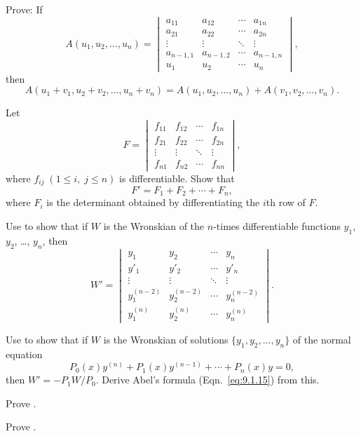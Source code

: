 \begin{exerciselist}
\item\label{exer:9.1.17}Prove:  If
\[
A(u_1,u_2,\dots,u_n)=
\begin{vmatrix}
a_{11}&a_{12}&\cdots&a_{1n}\\
a_{21}&a_{22}&\cdots&a_{2n}\\
\vdots&\vdots&\ddots&\vdots\\
a_{n-1,1}&a_{n-1,2}&\cdots&a_{n-1,n}\\
u_1&u_2&\cdots&u_n
\end{vmatrix},
\]
then
\[
A(u_1+v_1, u_2+v_2,\dots,
  u_n+v_n)=A(u_1,u_2,\dots,u_n)+A(v_1,v_2,\dots,
  v_n).
\]

\item\label{exer:9.1.18}Let
\[
F=\begin{vmatrix}
f_{11}&f_{12}&\cdots&f_{1n}\\
f_{21}&f_{22}&\cdots&f_{2n}\\
\vdots&\vdots&\ddots&\vdots\\
f_{n1}&f_{n2}&\cdots&f_{nn}
\end{vmatrix},
\]
where $f_{ij}\; (1\le i,\;   j\le n)$ is differentiable.  Show that
\[
F'=F_1+F_2+\cdots+F_n,
\]
where $F_i$ is the determinant obtained by differentiating the
$i$th row of $F$.


\item\label{exer:9.1.19}Use   to show that if $W$ is the
Wronskian of the
$n$-times differentiable functions $y_1$, $y_2$, \dots, $y_n$, then
\[
W'=
\begin{vmatrix}
y_1&y_2&\cdots&y_n\\
y'_1&y'_2&\cdots&y'_n\\
\vdots&\vdots&\ddots&\vdots\\
y_1^{(n-2)}&y_2^{(n-2)}&\cdots&y_n^{(n-2)}\\
y_1^{(n)}&y_2^{(n)}&\cdots&y_n^{(n)}
\end{vmatrix}.
\]

\item\label{exer:9.1.20}Use  to show that if $W$ is
the Wronskian
of  solutions $\{y_1,y_2,\dots,y_n\}$ of the normal equation
\[
P_0(x)y^{(n)}+P_1(x)y^{(n-1)}+\cdots+P_n(x)y=0,
\tag{A}
\]
then $W'=-P_1W/P_0$.
Derive Abel's formula (Eqn.~\eqref{eq:9.1.15}) from this.

\item\label{exer:9.1.21}Prove .

\item\label{exer:9.1.22}Prove .




\end{exerciselist}
